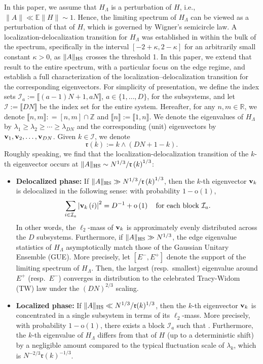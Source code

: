 \documentclass[10pt,reqno]{amsart}
\numberwithin{equation}{section}
\numberwithin{figure}{section}
\theoremstyle{plain} %
\theoremstyle{definition} %
\newcommand{\cal}{\mathcal}
\renewcommand{\txt}[1]{\text{\rm{#1}}}
\newcommand{\E}{\mathbb{E}}
\newcommand{\R}{\mathbb{R}}
\newcommand{\Z}{\mathbb{Z}}
\newcommand{\cI}{\mathcal{I}}
\renewcommand{\geq}{\ge}
\newcommand{\pa}[1]{\left({#1}\right)}
\newcommand{\qa}[1]{\left[{#1}\right]}
\newcommand{\absa}[1]{\left\lvert #1 \right\rvert}
\newcommand{\bv}{{\bf{v}}}
\newcommand{\be}{\begin{equation}}
\newcommand{\ee}{\end{equation}}
\newcommand{\oo}{\mathrm{o}}
\newcommand{\HS}{\txt{HS}}
\numberwithin{equation}{section}
\begin{document}
In this paper, we assume that $H_{\Lambda}$ is a perturbation of $H$, i.e., $\|A\|\ll \E\|H\|\sim 1$. 
Hence, the limiting spectrum of $H_{\Lambda}$ can be viewed as a perturbation of that of $H$, which is governed by Wigner's semicircle law. 
A localization-delocalization transition for $H_{\Lambda}$ was established in \cite{stone2024randommatrixmodelquantum} within the bulk of the spectrum, specifically in the interval $[-2+\kappa,2-\kappa]$ for an arbitrarily small constant $\kappa>0$, as $\|A\|_{\HS}$ crosses the threshold 1. In this paper, we extend that result to the entire spectrum, with a particular focus on the edge regime,
and establish a full characterization of the localization–delocalization transition for the corresponding eigenvectors.
For simplicity of presentation, we define the index sets ${\cal I}_a:=\llbracket (a-1)N+1,aN\rrbracket$, $a \in \{ 1,\ldots,D\}$, for the subsystems, and let $\cal I:=\llbracket DN\rrbracket$ be the index set for the entire system. 
Hereafter, for any $n,m\in \R$, we denote $\llbracket n, m\rrbracket: = [n,m]\cap \Z$ and $\llbracket n\rrbracket:=\llbracket1, n\rrbracket$. 
We denote the eigenvalues of $H_{\Lambda}$ by $\lambda_1\geq \lambda_2\geq \cdots \geq \lambda_{DN}$ and the corresponding (unit) eigenvectors by ${\bf v}_1,\mathbf{v}_2,\ldots, {\bf v}_{DN}$. Given $k\in\cal I$, we denote \be\label{eq:rk}\mathfrak{r}\pa{k}:=k\wedge \pa{DN+1-k}.\ee 
Roughly speaking, we find that the localization-delocalization transition of the $k$-th eigenvector occurs at $\|A\|_{\HS}\sim N^{1/3}/\mathfrak{r}\pa{k}^{1/3}$:
\begin{itemize}
    \item \textbf{Delocalized phase:} 
    If $\|A\|_{\HS}\gg N^{1/3}/\mathfrak{r}\pa{k}^{1/3}$, then the $k$-th eigenvector $\bv_k$ is delocalized in the following sense: with probability $1-\oo\pa{1}$, \be\label{eq:intro_delocal}\sum_{i\in\cI_a}\absa{\bv_{k}\pa{i}}^2=D^{-1}+\oo\pa{1} \quad \text{for each block $\cI_a$}.
    \ee
    In other words, the $\ell_2$-mass of $\bv_k$ is approximately evenly distributed across the $D$ subsystems. Furthermore, if $\|A\|_{\HS}\gg N^{1/3}$, the edge eigenvalue statistics of $H_\Lambda$ asymptotically match those of the Gaussian Unitary Ensemble (GUE). 
    More precisely, let $\qa{E^-,E^+}$ denote the support of the limiting spectrum of $H_\Lambda$. Then, the largest (resp.~smallest) eigenvalue around $E^+$ (resp.~$E^-$) converges in distribution to the celebrated Tracy-Widom (TW) law \cite{TW,TW1} under the $(DN)^{2/3}$ scaling.  
        
    \item \textbf{Localized phase:} If $\|A\|_{\HS}\ll N^{1/3}/\mathfrak{r}(k)^{1/3}$, then the $k$-th eigenvector $\bv_k$ is concentrated in a single subsystem in terms of its $\ell_2$-mass. More precisely, with probability $1-\oo\pa{1}$, there exists a block $\cal I_a$ such that \smash{$\sum_{i\in\cI_a}\absa{\bv_{k}\pa{i}}^2=1+\oo\pa{1}$}. Furthermore, the $k$-th eigenvalue of $H_\Lambda$ differs from that of $H$ (up to a deterministic shift) by a negligible amount compared to the typical fluctuation scale of $\lambda_k$, which is $N^{-2/3}\mathfrak{r}(k)^{-1/3}$.  
\end{itemize}
\end{document}
